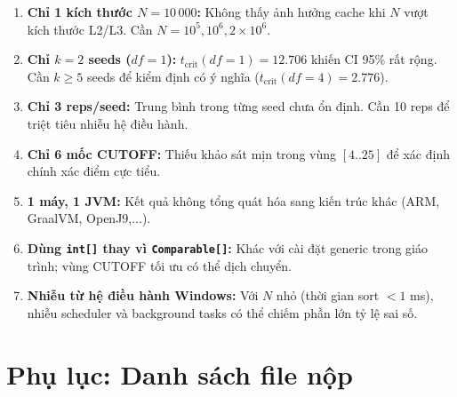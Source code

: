 \documentclass[12pt, a4paper]{article}
\begin{document}
\begin{enumerate}
    \item \textbf{Chỉ 1 kích thước $N = 10\,000$:} Không thấy ảnh hưởng cache khi
          $N$ vượt kích thước L2/L3. Cần $N = 10^5, 10^6, 2 \times 10^6$.
    \item \textbf{Chỉ $k = 2$ seeds ($df = 1$):} $t_{\text{crit}}(df=1) = 12.706$
          khiến CI 95\% rất rộng. Cần $k \geq 5$ seeds để kiểm định có ý nghĩa
          ($t_{\text{crit}}(df=4) = 2.776$).
    \item \textbf{Chỉ 3 reps/seed:} Trung bình trong từng seed chưa ổn định.
          Cần 10 reps để triệt tiêu nhiễu hệ điều hành.
    \item \textbf{Chỉ 6 mốc CUTOFF:} Thiếu khảo sát mịn trong vùng $[4..25]$ để
          xác định chính xác điểm cực tiểu.
    \item \textbf{1 máy, 1 JVM:} Kết quả không tổng quát hóa sang kiến trúc khác
          (ARM, GraalVM, OpenJ9,...).
    \item \textbf{Dùng \texttt{int[]} thay vì \texttt{Comparable[]}:} Khác với
          cài đặt generic trong giáo trình; vùng CUTOFF tối ưu có thể dịch chuyển.
    \item \textbf{Nhiễu từ hệ điều hành Windows:} Với $N$ nhỏ (thời gian sort
          $< 1$ ms), nhiễu scheduler và background tasks có thể chiếm phần lớn
          tỷ lệ sai số.
\end{enumerate}

\newpage
\appendix
\section{Phụ lục: Danh sách file nộp}
\end{document}

